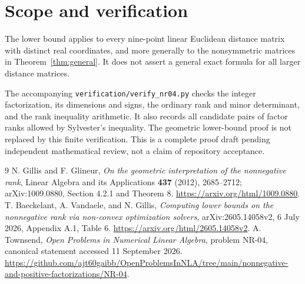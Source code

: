 \documentclass[11pt]{article}
\begin{document}
\section{Scope and verification}
The lower bound applies to every nine-point linear Euclidean distance matrix with distinct real coordinates, and more generally to the nonsymmetric matrices in Theorem~\ref{thm:general}. It does not assert a general exact formula for all larger distance matrices.

The accompanying \texttt{verification/verify\_nr04.py} checks the integer factorization, its dimensions and signs, the ordinary rank and minor determinant, and the rank inequality arithmetic. It also records all candidate pairs of factor ranks allowed by Sylvester's inequality. The geometric lower-bound proof is not replaced by this finite verification. This is a complete proof draft pending independent mathematical review, not a claim of repository acceptance.

\begin{thebibliography}{9}
 N. Gillis and F. Glineur, \emph{On the geometric interpretation of the nonnegative rank}, Linear Algebra and its Applications \textbf{437} (2012), 2685--2712; arXiv:1009.0880, Section 4.2.1 and Theorem 8.
\url{https://arxiv.org/html/1009.0880}.
 T. Baeckelant, A. Vandaele, and N. Gillis, \emph{Computing lower bounds on the nonnegative rank via non-convex optimization solvers}, arXiv:2605.14058v2, 6 July 2026, Appendix A.1, Table 6.
\url{https://arxiv.org/html/2605.14058v2}.
 A. Townsend, \emph{Open Problems in Numerical Linear Algebra}, problem NR-04, canonical statement accessed 11 September 2026.
\url{https://github.com/ajt60gaibb/OpenProblemsInNLA/tree/main/nonnegative-and-positive-factorizations/NR-04}.
\end{thebibliography}
\end{document}
